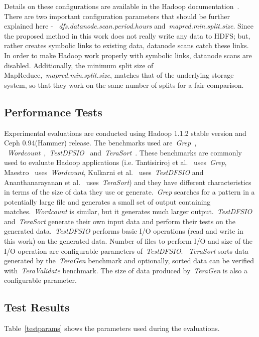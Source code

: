 Details on these configurations are available in the Hadoop documentation~\cite{hadoopconf}.
There are two important configuration parameters that should be further explained here -
~\textit{dfs.datanode.scan.period.hours} and~\textit{mapred.min.split.size}. Since the
proposed method in this work does not really write any data to HDFS; but, rather creates
symbolic links to existing data, datanode scans catch these links. In order to make Hadoop
work properly with symbolic links, datanode scans are disabled. Additionally, the minimum
split size of MapReduce,~\textit{mapred.min.split.size}, matches that of the underlying
storage system, so that they work on the same number of splits for a fair comparison.

\subsection{Performance Tests}
Experimental evaluations are conducted using Hadoop 1.1.2 stable version and
Ceph 0.94(Hammer) release. The benchmarks used are~\textit{Grep}~\cite{hadoopgrep},
~\textit{Wordcount}~\cite{hadoopwordcount},~\textit{TestDFSIO}~\cite{hadooptestdfsio}
and~\textit{TeraSort}~\cite{hadoopterasort}. These benchmarks are commonly used to evaluate
Hadoop applications (i.e. Tantisiriroj et al.~\cite{Tantisiriroj:2011:DDF:2063384.2063474}
uses~\textit{Grep}, Maestro~\cite{6217451} uses~\textit{Wordcount}, Kulkarni et
al.~\cite{hadoopyarnprogress} uses~\textit{TestDFSIO} and Ananthanarayanan et
al.~\cite{Ananthanarayanan:2009:CAW:1855533.1855548} uses~\textit{TeraSort})
and they have different characteristics in terms of the size of data
they use or generate.~\textit{Grep} searches for a pattern in a potentially large file
and generates a small set of output containing matches.~\textit{Wordcount} is similar,
but it generates much larger output.~\textit{TestDFSIO} and~\textit{TeraSort} generate
their own input data and perform their tests on the generated data.~\textit{TestDFSIO}
performs basic I/O operations (read and write in this work) on the generated data. Number of
files to perform I/O and size of the I/O operation are configurable parameters of~\textit{TestDFSIO}.
~\textit{TeraSort} sorts data generated by the~\textit{TeraGen} benchmark and optionally, sorted
data can be verified with~\textit{TeraValidate} benchmark. The size of data produced by~\textit{TeraGen}
is also a configurable parameter.

\subsection{Test Results}
Table~\ref{testparams} shows the parameters used during the evaluations.


